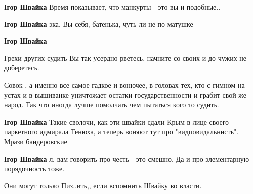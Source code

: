 \begin{itemize}
\begin{itemize}
\textbf{Ігор Швайка} Время показывает, что манкурты - это вы и подобные..

 
\textbf{Ігор Швайка} эка, Вы себя, батенька, чуть ли не по матушке

 
\textbf{Ігор Швайка} 

Грехи других судить Вы так усердно рветесь, начните со своих и до чужих не
доберетесь.

Совок , а именно все самое гадкое и вонючее, в головах тех, кто с гимном на
устах и в вышиванке уничтожает остатки государственности и грабит свой же
народ. Так что иногда лучше помолчать чем пытаться кого то судить.


 
\textbf{Ігор Швайка} Такие сволочи, как эти швайки сдали Крым-в лице своего
паркетного адмирала Тенюха, а теперь воняют тут про "видповидальнисть". Мрази
бандеровские

 
\textbf{Ігор Швайка} л, вам говорить про честь - это смешно. Да и про элементарную порядочность тоже.

 
Они могут только Пиз..ить,, если вспомнить Швайку во власти.


\end{itemize}
\end{itemize}
